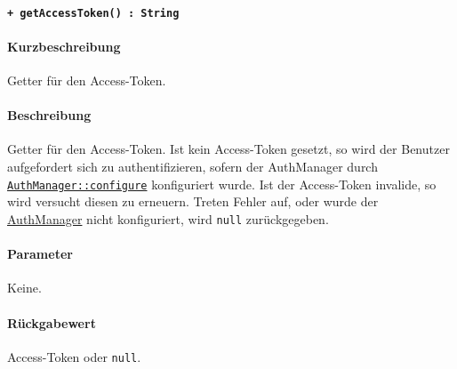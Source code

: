\paragraph{\texttt{+ getAccessToken() : String}}\label{AP_AuthManager_getAccessToken}%
\paragraph*{Kurzbeschreibung}
Getter für den Access-Token.
\paragraph*{Beschreibung}
Getter für den Access-Token.
Ist kein Access-Token gesetzt, so wird der Benutzer aufgefordert sich zu authentifizieren, sofern der AuthManager durch \hyperref[AP_AuthManager_configure]{\texttt{AuthManager::configure}} konfiguriert wurde.
Ist der Access-Token invalide, so wird versucht diesen zu erneuern.
Treten Fehler auf, oder wurde der \hyperref[AP_AuthManager]{AuthManager} nicht konfiguriert, wird \verb#null# zurückgegeben.
\paragraph*{Parameter}
Keine.
\paragraph*{Rückgabewert}
Access-Token oder \verb#null#.
